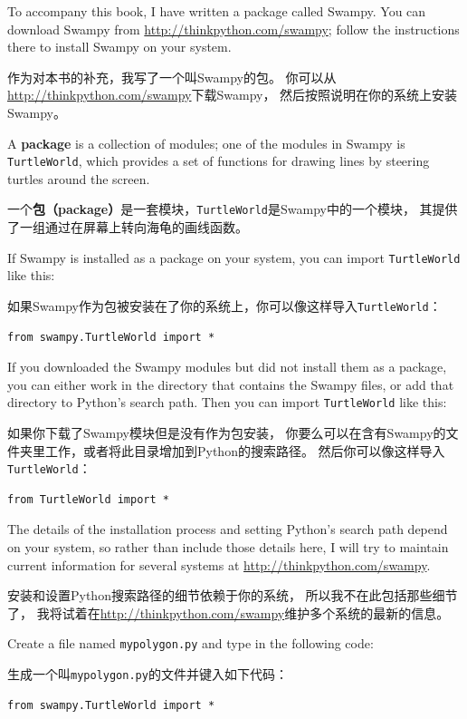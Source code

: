 \documentclass[10pt]{book}
\begin{document}
\begin{CJK}{UTF8}{gbsn}
To accompany this book, I have written a package called Swampy.
You can download Swampy from \url{http://thinkpython.com/swampy};
follow the instructions there to install Swampy on your system.

作为对本书的补充，我写了一个叫Swampy的包。
你可以从\url{http://thinkpython.com/swampy}下载Swampy，
然后按照说明在你的系统上安装Swampy。

A {\bf package} is a collection of modules; one of the modules in
Swampy is {\tt TurtleWorld}, which provides a set of functions for
drawing lines by steering turtles around the screen.

一个{\bf 包（package）}是一套模块，{\tt TurtleWorld}是Swampy中的一个模块，
其提供了一组通过在屏幕上转向海龟的画线函数。
 
If Swampy is installed as a package on your system, you can import
{\tt TurtleWorld} like this:

如果Swampy作为包被安装在了你的系统上，你可以像这样导入{\tt TurtleWorld}：

\begin{verbatim}
from swampy.TurtleWorld import *
\end{verbatim}

If you downloaded the Swampy modules but did not install them as a
package, you can either work in the directory that contains the Swampy
files, or add that directory to Python's search path.  Then you can import
{\tt TurtleWorld} like this:

如果你下载了Swampy模块但是没有作为包安装，
你要么可以在含有Swampy的文件夹里工作，或者将此目录增加到Python的搜索路径。
然后你可以像这样导入{\tt TurtleWorld}：

\begin{verbatim}
from TurtleWorld import *
\end{verbatim}

The details of the installation process and setting Python's search
path depend on your system, so rather than include those details here,
I will try to maintain current information for several systems
at \url{http://thinkpython.com/swampy}.

安装和设置Python搜索路径的细节依赖于你的系统，
所以我不在此包括那些细节了，
我将试着在\url{http://thinkpython.com/swampy}维护多个系统的最新的信息。

Create a file named {\tt mypolygon.py} and type in the following
code:

生成一个叫{\tt mypolygon.py}的文件并键入如下代码：

\begin{verbatim}
from swampy.TurtleWorld import *


\end{verbatim}
\end{CJK}
\end{document}
